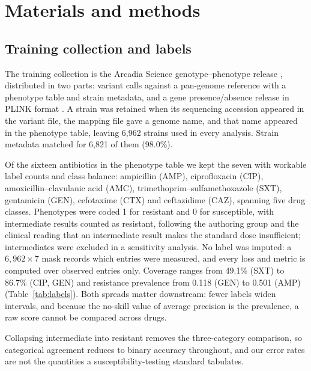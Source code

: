 \section*{Materials and methods}

\subsection*{Training collection and labels}
The training collection is the Arcadia Science \Ecoli{} genotype--phenotype release
\cite{arcadia2024dataset,bell2025arcadia}, distributed in two parts: variant calls against a
pan-genome reference with a phenotype table and strain metadata, and a gene presence/absence
release in PLINK format \cite{purcell2007plink}. A strain was retained when its sequencing
accession appeared in the variant file, the mapping file gave a genome name, and that name
appeared in the phenotype table, leaving 6,962 strains used in every analysis. Strain metadata
matched for 6,821 of them (98.0\%).

Of the sixteen antibiotics in the phenotype table we kept the seven with workable label counts and
class balance: ampicillin (AMP), ciprofloxacin (CIP), amoxicillin--clavulanic acid (AMC),
trimethoprim--sulfamethoxazole (SXT), gentamicin (GEN), cefotaxime (CTX) and ceftazidime (CAZ),
spanning five drug classes. Phenotypes were coded 1 for resistant and 0 for susceptible, with
intermediate results counted as resistant, following the authoring group and the clinical reading
that an intermediate result makes the standard dose insufficient; intermediates were excluded in a
sensitivity analysis. No label was imputed: a $6{,}962 \times 7$ mask records which entries were
measured, and every loss and metric is computed over observed entries only. Coverage ranges from
49.1\% (SXT) to 86.7\% (CIP, GEN) and resistance prevalence from 0.118 (GEN) to 0.501 (AMP)
(Table~\ref{tab:labels}). Both spreads matter downstream: fewer labels widen intervals, and because
the no-skill value of average precision is the prevalence, a raw score cannot be compared across
drugs.

Collapsing intermediate into resistant removes the three-category comparison, so categorical
agreement reduces to binary accuracy throughout, and our error rates are not the quantities a
susceptibility-testing standard tabulates.

